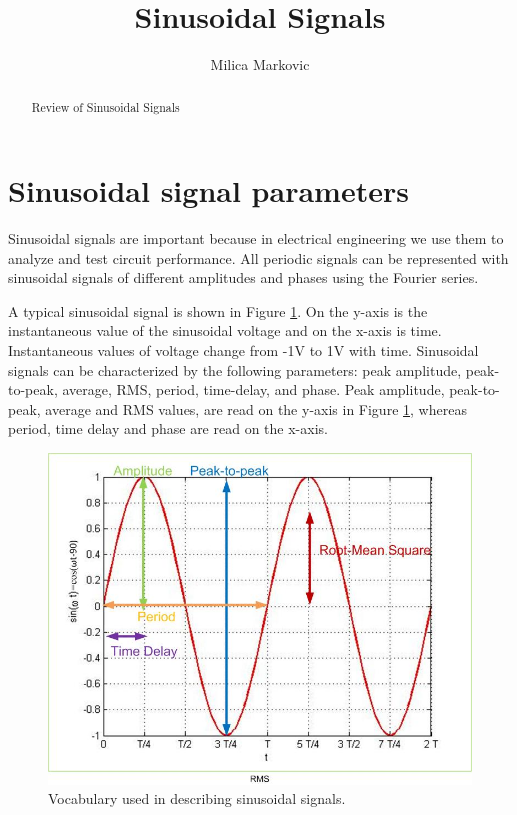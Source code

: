 \documentclass{ximera}
\title{Sinusoidal Signals}
\author{Milica Markovic}
\begin{document}
  
\begin{abstract}  
Review of Sinusoidal Signals
\end{abstract}  
\maketitle

\section{Sinusoidal signal parameters}

Sinusoidal signals are important because in electrical engineering we use them to analyze and test circuit performance. All periodic signals can be represented with sinusoidal signals of different amplitudes and phases using the Fourier series. 

A typical sinusoidal signal is shown in Figure \ref{sinusoid}. On the y-axis is the instantaneous value of the sinusoidal voltage and on the x-axis is time. Instantaneous values of voltage change from -1V to 1V with time. Sinusoidal signals can be characterized by the following parameters: peak amplitude, peak-to-peak, average, RMS, period, time-delay, and phase. Peak amplitude, peak-to-peak, average and RMS values, are read on the y-axis in Figure \ref{sinusoid}, whereas period, time delay and phase are read on the x-axis.

\begin{figure}[htbp]
\begin{center}
\includegraphics[scale=0.4]{../jpg/sinusoid.jpg}
\caption{Vocabulary used in describing sinusoidal signals.}
\label{sinusoid}
\end{center}
\end{figure} 
\end{document}

